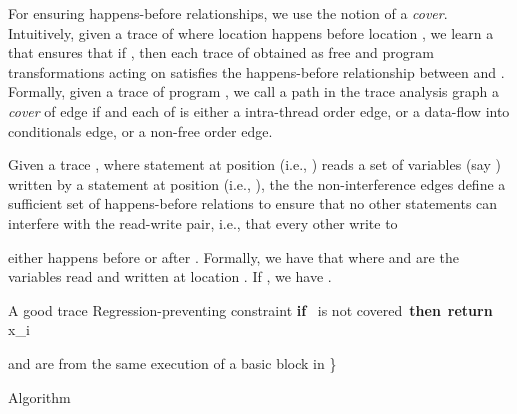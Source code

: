 \documentclass{llncs}
\begin{document}
For ensuring happens-before relationships, we use the notion of a {\em
cover}.
Intuitively, given a trace  of  where location 
happens before location ,
we learn a  that ensures that if ,
then each trace  of  obtained as free and program
transformations acting on  satisfies the happens-before
relationship between  and .
Formally, given a trace  of program , we call a path  in the trace analysis graph a {\em cover} of
edge  if  and each of 
is either a intra-thread order edge, or a  data-flow into conditionals
edge, or a non-free order edge.

Given a trace , where statement at position  (i.e., ) reads a set
of variables (say ) written by a statement at position  (i.e.,
), the the non-interference edges define a sufficient set of
happens-before relations to ensure that no other statements can
interfere with the read-write pair, i.e., that every other write to

either happens before  or after .
Formally, we have that  where  and  are the 
variables read and written at location .
If , we have .
\begin{algorithm}
  \begin{algorithmic}[1]
    \REQUIRE A good trace 
    \ENSURE Regression-preventing constraint 
    \STATE 
    \FORALL {}
    \STATE \textbf{if}~ is not
    covered~\textbf{then}~\textbf{return}~~\label{line:ret_fallback}
      \STATE 
        \label{line:pick_cover}
      \STATE x_i \neq \bot
      \item[]  and  are from the same
  execution of a basic block in  \}
\ENDFOR
      \STATE 
    \ENDFOR
    \RETURN {} \label{line:ret_normal}
  \end{algorithmic}
  \caption{Algorithm } 
  \label{algo:learn_good}
\end{algorithm}
\end{document}
